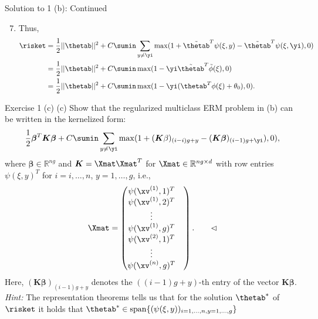 \documentclass[aspectratio=169]{beamer}
\newcommand{\betav}{\bm{\beta}}
\newcommand{\Kmat}{\bm{K}}
\newcommand{\phitxi}{\tilde{\phi}(\xi)}
\renewcommand{\phixi}{\phi(\xi)}
\newcommand{\psixiy}{\psi(\xi, y)}
\newcommand{\psixiyi}{\psi(\xi, \yi)}
\newcommand{\thetabt}{\tilde{\thetab}}
\begin{document}
\begin{frame}{Solution to 1 (b): Continued}
	\begin{enumerate}
		\setcounter{enumi}{6}
		\item Thus, 
				\begin{align*}
					\risket &= \frac{1}{2}||\thetab||^2 + C \sumin \sum_{y \neq \yi} \max(1 + \thetabt^T \psixiy - \thetabt^T \psixiyi, 0) \\
					&= \frac{1}{2} ||\thetab||^2 + C \sumin \max(1 - \yi \thetabt^T\phitxi, 0) \\
					&= \frac{1}{2} ||\thetab||^2 + C \sumin \max(1 - \yi (\thetab^T \phixi + \theta_0), 0).
				\end{align*}
	\end{enumerate}
\end{frame}

\begin{frame}{Exercise 1 (c)}
	\footnotesize
	(c) Show that the regularized multiclass ERM problem in (b) can be written in the kernelized form:
	$$\frac{1}{2} \betav^T \Kmat \betav + C\sumin \sum_{y \neq \yi} \max (1 + (\Kmat \beta)_{(i-i)g + y} - (\Kmat \betav)_{(i-1)g + \yi}), 0),$$
	where $\betav \in \mathbb{R}^{ng}$ and $\Kmat = \Xmat \Xmat^T$ for $\Xmat \in \mathbb{R}^{ng \times d} $ with row entries $\psi(\xi, y)^T $ for $i = i, \ldots, n$, $y = 1, \ldots, g$, i.e., 
	$$\Xmat = \begin{pmatrix}
		\psi(\xv^{(1)}, 1)^T & \\
		\psi(\xv^{(1)}, 2)^T & \\
		\vdots & \\
		\psi(\xv^{(1)}, g)^T &  \\
		\psi(\xv^{(2)}, 1)^T & \\
		\vdots & \\
		\psi(\xv^{(n)}, g)^T &  \\
	\end{pmatrix}. \qquad \lhd$$
	Here, $(\Kmat \betav)_{(i-1)g + y}$ denotes the $((i-1)g + y)$-th entry of the vector $\Kmat \betav$. \emph{Hint:} The representation theorems tells us that for the solution $\thetab^*$ of $\risket$ it holds that $\thetab^* \in \mathrm{span} \{(\psi(\xi, y))_{i=1, \ldots, n, y=1, \ldots, g} \}$
\end{frame}
\end{document}
